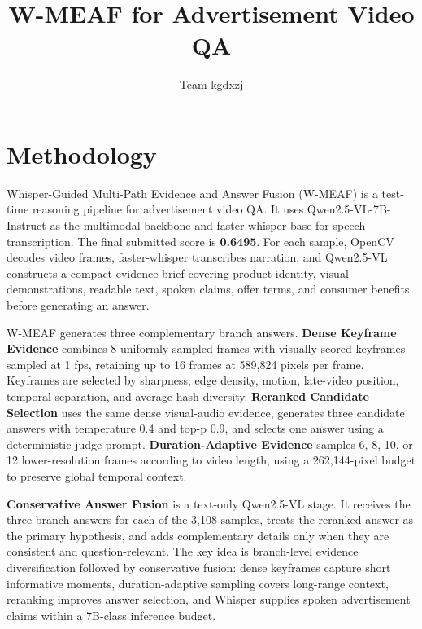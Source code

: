 \documentclass[runningheads]{llncs}
\begin{document}
\title{W-MEAF for Advertisement Video QA}

\author{Team kgdxzj}
\institute{}

\maketitle

\section*{Methodology}

Whisper-Guided Multi-Path Evidence and Answer Fusion (W-MEAF) is a test-time reasoning pipeline for advertisement video QA. It uses Qwen2.5-VL-7B-Instruct as the multimodal backbone and faster-whisper base for speech transcription. The final submitted score is \textbf{0.6495}. For each sample, OpenCV decodes video frames, faster-whisper transcribes narration, and Qwen2.5-VL constructs a compact evidence brief covering product identity, visual demonstrations, readable text, spoken claims, offer terms, and consumer benefits before generating an answer.

W-MEAF generates three complementary branch answers. \textbf{Dense Keyframe Evidence} combines 8 uniformly sampled frames with visually scored keyframes sampled at 1 fps, retaining up to 16 frames at 589,824 pixels per frame. Keyframes are selected by sharpness, edge density, motion, late-video position, temporal separation, and average-hash diversity. \textbf{Reranked Candidate Selection} uses the same dense visual-audio evidence, generates three candidate answers with temperature 0.4 and top-p 0.9, and selects one answer using a deterministic judge prompt. \textbf{Duration-Adaptive Evidence} samples 6, 8, 10, or 12 lower-resolution frames according to video length, using a 262,144-pixel budget to preserve global temporal context.

\textbf{Conservative Answer Fusion} is a text-only Qwen2.5-VL stage. It receives the three branch answers for each of the 3,108 samples, treats the reranked answer as the primary hypothesis, and adds complementary details only when they are consistent and question-relevant. The key idea is branch-level evidence diversification followed by conservative fusion: dense keyframes capture short informative moments, duration-adaptive sampling covers long-range context, reranking improves answer selection, and Whisper supplies spoken advertisement claims within a 7B-class inference budget.
\end{document}
